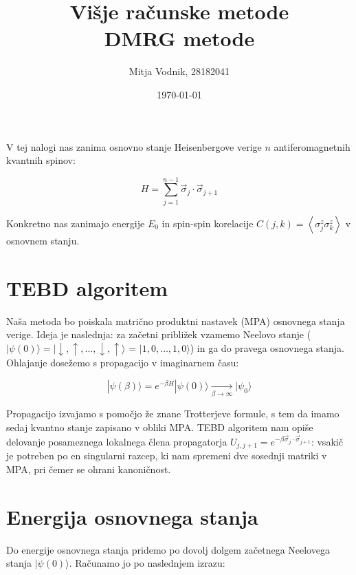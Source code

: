 \documentclass[a4paper]{article}
\newcommand{\ket}[1]{|#1\rangle}
\newcommand{\s}{\sigma}
\newcommand{\vs}{\vec{\s}}
\newcommand{\expected}[1]{\left\langle #1 \right\rangle}
\newcommand{\up}{\uparrow}
\newcommand{\down}{\downarrow}
\begin{document}
    \title{\sc\large Višje računske metode\\
		\bigskip
		\bf\Large DMRG metode}
	\author{Mitja Vodnik, 28182041}
            \date{\today}
	\maketitle

    V tej nalogi nas zanima osnovno stanje Heisenbergove verige $n$ antiferomagnetnih kvantnih spinov:

    \begin{equation}\label{eq1}
        H = \sum_{j=1}^{n-1} \vs_j \cdot \vs_{j+1}
    \end{equation}

    Konkretno nas zanimajo energije $E_0$ in spin-spin korelacije $C(j, k) = \expected{\s^z_j\s^z_k}$ v osnovnem stanju.

    \section{TEBD algoritem}

    Naša metoda bo poiskala matrično produktni nastavek (MPA) osnovnega stanja verige. Ideja je naslednja: za začetni približek vzamemo Neelovo
    stanje ($\ket{\psi(0)} = \ket{\down, \up, \ldots, \down, \up}$ = $\ket{1, 0, \ldots, 1, 0}$) in ga  do pravega osnovnega
    stanja.
    Ohlajanje dosežemo s propagacijo v imaginarnem času:

    \begin{equation}\label{eq2}
        \ket{\psi(\beta)} = e^{-\beta H} \ket{\psi(0)} \xrightarrow[\beta \to \infty]{} \ket{\psi_0}
    \end{equation}

    Propagacijo izvajamo s pomočjo že znane Trotterjeve formule, s tem da imamo sedaj kvantno stanje zapisano v obliki MPA. TEBD algoritem nam opiše
    delovanje posameznega lokalnega člena propagatorja $U_{j, j+1} = e^{-\beta \vs_j \cdot \vs_{j+1}}$: vsakič je potreben po en singularni razcep,
    ki nam spremeni dve sosednji matriki v MPA, pri čemer se ohrani kanoničnost.

    \section{Energija osnovnega stanja}

    Do energije osnovnega stanja pridemo po dovolj dolgem  začetnega Neelovega stanja $\ket{\psi(0)}$.
    Računamo jo po naslednjem izrazu:
\end{document}
